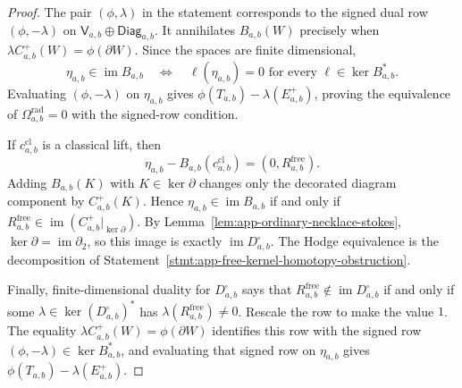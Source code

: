 \begin{proof}
  The pair \((\phi,\lambda)\) in the statement corresponds to the signed
  dual row \((\phi,-\lambda)\) on
  \(\mathsf V_{a,b}\oplus\mathsf{Diag}_{a,b}\).  It annihilates
  \(B_{a,b}(W)\) precisely when
  \(\lambda C^+_{a,b}(W)=\phi(\partial W)\).  Since the spaces are finite
  dimensional,
  \[
    \eta_{a,b}\in\operatorname{im}B_{a,b}
    \quad\Longleftrightarrow\quad
    \ell(\eta_{a,b})=0
    \text{ for every }\ell\in\ker B_{a,b}^* .
  \]
  Evaluating \((\phi,-\lambda)\) on \(\eta_{a,b}\) gives
  \(\phi(T_{a,b})-\lambda(E^+_{a,b})\), proving the equivalence of
  \(\Omega^{\mathrm{rad}}_{a,b}=0\) with the signed-row condition.

  If \(c^{\mathrm{cl}}_{a,b}\) is a classical lift, then
  \[
    \eta_{a,b}-B_{a,b}(c^{\mathrm{cl}}_{a,b})
    =
    (0,R^{\mathrm{free}}_{a,b}).
  \]
  Adding \(B_{a,b}(K)\) with \(K\in\ker\partial\) changes only the
  decorated diagram component by \(C^+_{a,b}(K)\).  Hence
  \(\eta_{a,b}\in\operatorname{im}B_{a,b}\) if and only if
  \(R^{\mathrm{free}}_{a,b}\in
  \operatorname{im}(C^+_{a,b}|_{\ker\partial})\).  By
  Lemma~\ref{lem:app-ordinary-necklace-stokes},
  \(\ker\partial=\operatorname{im}\partial_2\), so this image is exactly
  \(\operatorname{im}D^\square_{a,b}\).  The Hodge equivalence is the
  decomposition of
  Statement~\ref{stmt:app-free-kernel-homotopy-obstruction}.

  Finally, finite-dimensional duality for \(D^\square_{a,b}\) says that
  \(R^{\mathrm{free}}_{a,b}\notin\operatorname{im}D^\square_{a,b}\) if
  and only if some \(\lambda\in\ker(D^\square_{a,b})^*\) has
  \(\lambda(R^{\mathrm{free}}_{a,b})\ne0\).  Rescale the row to make the
  value \(1\).  The equality
  \(\lambda C^+_{a,b}(W)=\phi(\partial W)\) identifies this row with the
  signed row \((\phi,-\lambda)\in\ker B_{a,b}^*\), and evaluating that
  signed row on \(\eta_{a,b}\) gives
  \(\phi(T_{a,b})-\lambda(E^+_{a,b})\).
\end{proof}

